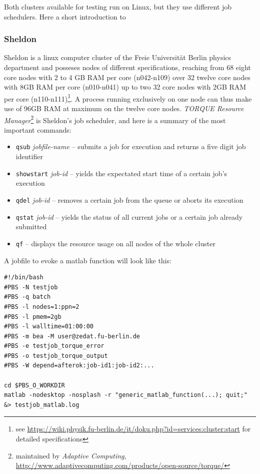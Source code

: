 \documentclass[11.5pt,a4paper]{article}
\begin{document}
Both clusters available for testing run on Linux, but they use different job schedulers. Here a short introduction to 
\subsubsection{Sheldon}
Sheldon is a linux computer cluster of the Freie Universit\"at Berlin physics department and posseses nodes of different specifications, reaching from 68 eight core nodes with 2 to 4 GB RAM per core (n042-n109) over 32 twelve core nodes with 8GB RAM per core (n010-n041) up to two 32 core nodes with 2GB RAM per core (n110-n111)\footnote{see \url{https://wiki.physik.fu-berlin.de/it/doku.php?id=services:cluster:start} for detailed specifications}. A process running exclusively on one node can thus make use of 96GB RAM at maximum on the twelve core nodes. \emph{TORQUE Resource Manager}\footnote{maintained by \emph{Adaptive Computing}, \url{http://www.adaptivecomputing.com/products/open-source/torque/}} is Sheldon's job scheduler, and here is a summary of the most important commands:
\begin{itemize}
 \item \verb$qsub$ \emph{jobfile-name} -- submits a job for execution and returns a five digit job identifier
  \item \verb$showstart$ \emph{job-id} -- yields the expectated start time of a certain job's execution
  \item \verb$qdel$ \emph{job-id} -- removes a certain job from the queue or aborts its execution
  \item \verb$qstat$ {\emph{job-id}} -- yields the status of all current jobs {or a certain job already submitted}
  \item \verb$qf$ -- displays the resource usage on all nodes of the whole cluster
\end{itemize}
A jobfile to evoke a matlab function will look like this:
\begin{lstlisting}
#!/bin/bash
#PBS -N testjob
#PBS -q batch
#PBS -l nodes=1:ppn=2
#PBS -l pmem=2gb
#PBS -l walltime=01:00:00
#PBS -m bea -M user@zedat.fu-berlin.de
#PBS -e testjob_torque_error
#PBS -o testjob_torque_output
#PBS -W depend=afterok:job-id1:job-id2:...

cd $PBS_O_WORKDIR
matlab -nodesktop -nosplash -r "generic_matlab_function(...); quit;" &> testjob_matlab.log
\end{lstlisting}
\end{document}
